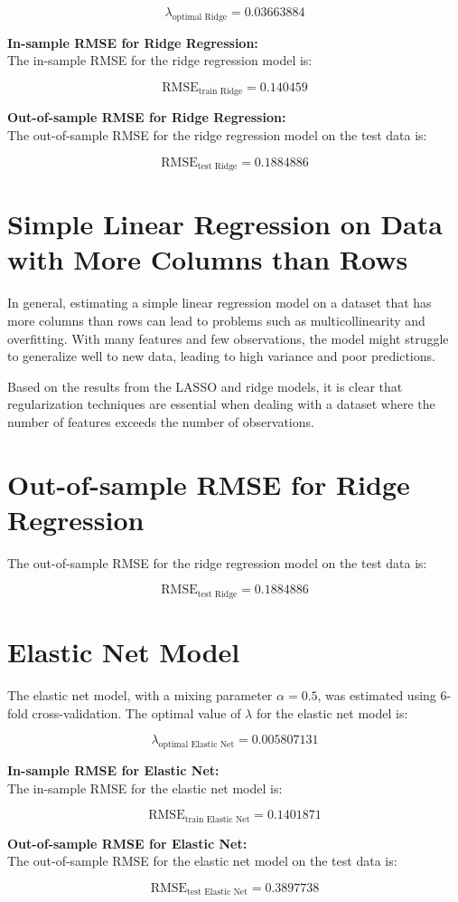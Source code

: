 \documentclass{article}
\begin{document}
\[
\lambda_{\text{optimal Ridge}} = 0.03663884
\]

\textbf{In-sample RMSE for Ridge Regression:} \\
The in-sample RMSE for the ridge regression model is:

\[
\text{RMSE}_{\text{train Ridge}} = 0.140459
\]

\textbf{Out-of-sample RMSE for Ridge Regression:} \\
The out-of-sample RMSE for the ridge regression model on the test data is:

\[
\text{RMSE}_{\text{test Ridge}} = 0.1884886
\]

\section*{Simple Linear Regression on Data with More Columns than Rows}

In general, estimating a simple linear regression model on a dataset that has more columns than rows can lead to problems such as multicollinearity and overfitting. With many features and few observations, the model might struggle to generalize well to new data, leading to high variance and poor predictions.

Based on the results from the LASSO and ridge models, it is clear that regularization techniques are essential when dealing with a dataset where the number of features exceeds the number of observations.

\section*{Out-of-sample RMSE for Ridge Regression}

The out-of-sample RMSE for the ridge regression model on the test data is:

\[
\text{RMSE}_{\text{test Ridge}} = 0.1884886
\]

\section*{Elastic Net Model}

The elastic net model, with a mixing parameter \( \alpha = 0.5 \), was estimated using 6-fold cross-validation. The optimal value of \( \lambda \) for the elastic net model is:

\[
\lambda_{\text{optimal Elastic Net}} = 0.005807131
\]

\textbf{In-sample RMSE for Elastic Net:} \\
The in-sample RMSE for the elastic net model is:

\[
\text{RMSE}_{\text{train Elastic Net}} = 0.1401871
\]

\textbf{Out-of-sample RMSE for Elastic Net:} \\
The out-of-sample RMSE for the elastic net model on the test data is:

\[
\text{RMSE}_{\text{test Elastic Net}} = 0.3897738
\]
\end{document}
